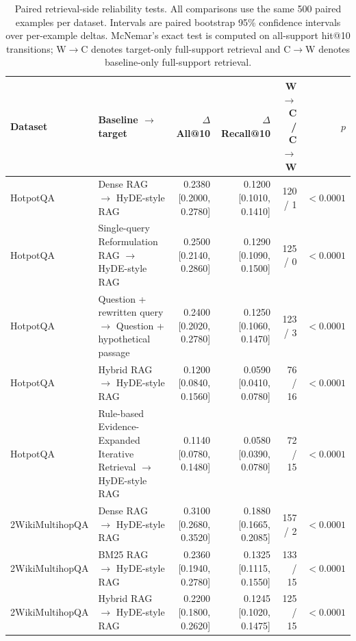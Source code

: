 \begin{table}[t]
\centering
\scriptsize
\caption{Paired retrieval-side reliability tests. All comparisons use the same 500 paired examples per dataset. Intervals are paired bootstrap 95\% confidence intervals over per-example deltas. McNemar's exact test is computed on all-support hit@10 transitions; W$\rightarrow$C denotes target-only full-support retrieval and C$\rightarrow$W denotes baseline-only full-support retrieval.}
\label{tab:retrieval_paired_tests}
\begin{tabularx}{\textwidth}{lXrrrr}
\toprule
Dataset & Baseline $\rightarrow$ target & $\Delta$ All@10 & $\Delta$ Recall@10 & W$\rightarrow$C / C$\rightarrow$W & $p$ \\
\midrule
HotpotQA & Dense RAG $\rightarrow$ HyDE-style RAG & 0.2380 [0.2000, 0.2780] & 0.1200 [0.1010, 0.1410] & 120 / 1 & $<0.0001$ \\
HotpotQA & Single-query Reformulation RAG $\rightarrow$ HyDE-style RAG & 0.2500 [0.2140, 0.2860] & 0.1290 [0.1090, 0.1500] & 125 / 0 & $<0.0001$ \\
HotpotQA & Question + rewritten query $\rightarrow$ Question + hypothetical passage & 0.2400 [0.2020, 0.2780] & 0.1250 [0.1060, 0.1470] & 123 / 3 & $<0.0001$ \\
HotpotQA & Hybrid RAG $\rightarrow$ HyDE-style RAG & 0.1200 [0.0840, 0.1560] & 0.0590 [0.0410, 0.0780] & 76 / 16 & $<0.0001$ \\
HotpotQA & Rule-based Evidence-Expanded Iterative Retrieval $\rightarrow$ HyDE-style RAG & 0.1140 [0.0780, 0.1480] & 0.0580 [0.0390, 0.0780] & 72 / 15 & $<0.0001$ \\
2WikiMultihopQA & Dense RAG $\rightarrow$ HyDE-style RAG & 0.3100 [0.2680, 0.3520] & 0.1880 [0.1665, 0.2085] & 157 / 2 & $<0.0001$ \\
2WikiMultihopQA & BM25 RAG $\rightarrow$ HyDE-style RAG & 0.2360 [0.1940, 0.2780] & 0.1325 [0.1115, 0.1550] & 133 / 15 & $<0.0001$ \\
2WikiMultihopQA & Hybrid RAG $\rightarrow$ HyDE-style RAG & 0.2200 [0.1800, 0.2620] & 0.1245 [0.1020, 0.1475] & 125 / 15 & $<0.0001$ \\
\bottomrule
\end{tabularx}
\end{table}
